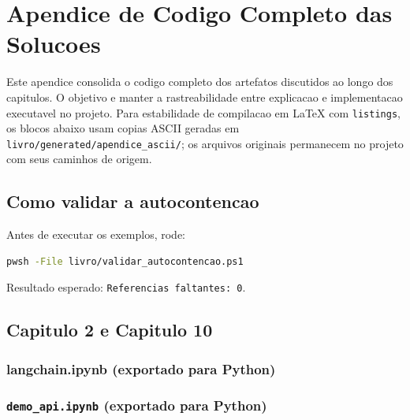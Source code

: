 \chapter{Apendice de Codigo Completo das Solucoes}
\label{apendice:codigo_completo}

Este apendice consolida o codigo completo dos artefatos discutidos ao longo dos capitulos.
O objetivo e manter a rastreabilidade entre explicacao e implementacao executavel no projeto.
Para estabilidade de compilacao em \LaTeX{} com \texttt{listings}, os blocos abaixo usam
copias ASCII geradas em \texttt{livro/generated/apendice\_ascii/}; os arquivos originais
permanecem no projeto com seus caminhos de origem.

\section{Como validar a autocontencao}

Antes de executar os exemplos, rode:

\begin{lstlisting}[language=bash,caption={Verificacao automatica de referencias de codigo no livro.}]
pwsh -File livro/validar_autocontencao.ps1
\end{lstlisting}

Resultado esperado: \texttt{Referencias faltantes: 0}.

\lstset{basicstyle=\ttfamily\footnotesize}

\section{Capitulo 2 e Capitulo 10}

\subsection{langchain.ipynb (exportado para Python)}


\subsection{\texttt{demo\_api.ipynb} (exportado para Python)}


